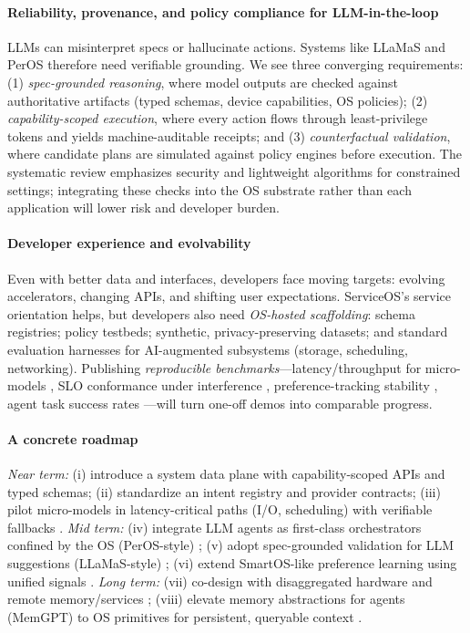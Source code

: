 \documentclass{article}
\begin{document}
\paragraph{Reliability, provenance, and policy compliance for LLM-in-the-loop}
LLMs can misinterpret specs or hallucinate actions. Systems like LLaMaS \cite{kamath2024llamas} and PerOS \cite{he2024peros} therefore need verifiable grounding. We see three converging requirements: (1) \emph{spec-grounded reasoning}, where model outputs are checked against authoritative artifacts (typed schemas, device capabilities, OS policies); (2) \emph{capability-scoped execution}, where every action flows through least-privilege tokens and yields machine-auditable receipts; and (3) \emph{counterfactual validation}, where candidate plans are simulated against policy engines before execution. The systematic review \cite{zhang2024systematic} emphasizes security and lightweight algorithms for constrained settings; integrating these checks into the OS substrate rather than each application will lower risk and developer burden.

\paragraph{Developer experience and evolvability}
Even with better data and interfaces, developers face moving targets: evolving accelerators, changing APIs, and shifting user expectations. ServiceOS’s service orientation \cite{liu2021serviceos} helps, but developers also need \emph{OS-hosted scaffolding}: schema registries; policy testbeds; synthetic, privacy-preserving datasets; and standard evaluation harnesses for AI-augmented subsystems (storage, scheduling, networking). Publishing \emph{reproducible benchmarks}—latency/throughput for micro-models \cite{hao2020linnos}, SLO conformance under interference \cite{bateni2020neuos}, preference-tracking stability \cite{goodarzy2021smartos}, agent task success rates \cite{he2024peros,packer2023memgpt}—will turn one-off demos into comparable progress.

\paragraph{A concrete roadmap}
\emph{Near term:} (i) introduce a system data plane with capability-scoped APIs and typed schemas; (ii) standardize an intent registry and provider contracts; (iii) pilot micro-models in latency-critical paths (I/O, scheduling) with verifiable fallbacks \cite{hao2020linnos,bateni2020neuos}.  
\emph{Mid term:} (iv) integrate LLM agents as first-class orchestrators confined by the OS (PerOS-style) \cite{he2024peros}; (v) adopt spec-grounded validation for LLM suggestions (LLaMaS-style) \cite{kamath2024llamas}; (vi) extend SmartOS-like preference learning using unified signals \cite{goodarzy2021smartos}.  
\emph{Long term:} (vii) co-design with disaggregated hardware and remote memory/services \cite{liu2021serviceos}; (viii) elevate memory abstractions for agents (MemGPT) to OS primitives for persistent, queryable context \cite{packer2023memgpt}.
\end{document}
